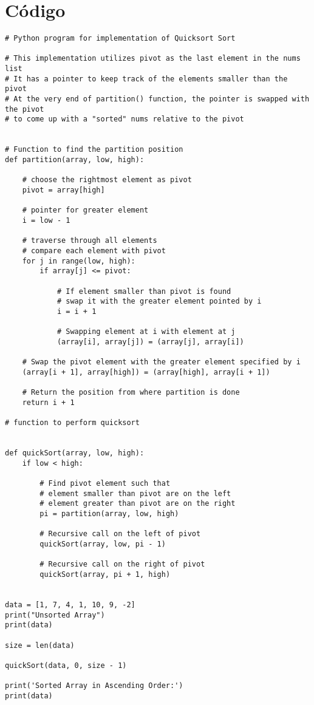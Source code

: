 \documentclass[red, ccm, assignment]{templateccm}
\begin{document}
\section{Código}

\begin{verbatim}
# Python program for implementation of Quicksort Sort

# This implementation utilizes pivot as the last element in the nums list
# It has a pointer to keep track of the elements smaller than the pivot
# At the very end of partition() function, the pointer is swapped with the pivot
# to come up with a "sorted" nums relative to the pivot


# Function to find the partition position
def partition(array, low, high):

    # choose the rightmost element as pivot
    pivot = array[high]

    # pointer for greater element
    i = low - 1

    # traverse through all elements
    # compare each element with pivot
    for j in range(low, high):
        if array[j] <= pivot:

            # If element smaller than pivot is found
            # swap it with the greater element pointed by i
            i = i + 1

            # Swapping element at i with element at j
            (array[i], array[j]) = (array[j], array[i])

    # Swap the pivot element with the greater element specified by i
    (array[i + 1], array[high]) = (array[high], array[i + 1])

    # Return the position from where partition is done
    return i + 1

# function to perform quicksort


def quickSort(array, low, high):
    if low < high:

        # Find pivot element such that
        # element smaller than pivot are on the left
        # element greater than pivot are on the right
        pi = partition(array, low, high)

        # Recursive call on the left of pivot
        quickSort(array, low, pi - 1)

        # Recursive call on the right of pivot
        quickSort(array, pi + 1, high)


data = [1, 7, 4, 1, 10, 9, -2]
print("Unsorted Array")
print(data)

size = len(data)

quickSort(data, 0, size - 1)

print('Sorted Array in Ascending Order:')
print(data)
\end{verbatim}

\end{document}
